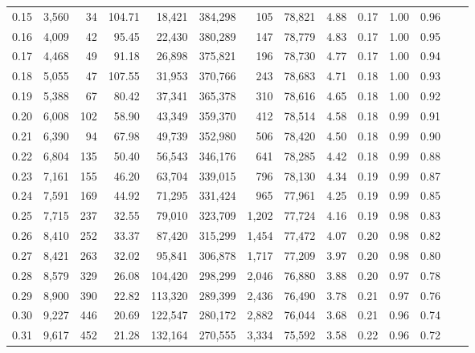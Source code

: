 \begin{tabular}{rrrrrrrrrrrrrr}
0.15 &   3,560 &     34 &  104.71 &   18,421 &  384,298 &     105 &  78,821 &  4.88 &  0.17 &  1.00 &      0.96 \\
0.16 &   4,009 &     42 &   95.45 &   22,430 &  380,289 &     147 &  78,779 &  4.83 &  0.17 &  1.00 &      0.95 \\
0.17 &   4,468 &     49 &   91.18 &   26,898 &  375,821 &     196 &  78,730 &  4.77 &  0.17 &  1.00 &      0.94 \\
0.18 &   5,055 &     47 &  107.55 &   31,953 &  370,766 &     243 &  78,683 &  4.71 &  0.18 &  1.00 &      0.93 \\
0.19 &   5,388 &     67 &   80.42 &   37,341 &  365,378 &     310 &  78,616 &  4.65 &  0.18 &  1.00 &      0.92 \\
0.20 &   6,008 &    102 &   58.90 &   43,349 &  359,370 &     412 &  78,514 &  4.58 &  0.18 &  0.99 &      0.91 \\
0.21 &   6,390 &     94 &   67.98 &   49,739 &  352,980 &     506 &  78,420 &  4.50 &  0.18 &  0.99 &      0.90 \\
0.22 &   6,804 &    135 &   50.40 &   56,543 &  346,176 &     641 &  78,285 &  4.42 &  0.18 &  0.99 &      0.88 \\
0.23 &   7,161 &    155 &   46.20 &   63,704 &  339,015 &     796 &  78,130 &  4.34 &  0.19 &  0.99 &      0.87 \\
0.24 &   7,591 &    169 &   44.92 &   71,295 &  331,424 &     965 &  77,961 &  4.25 &  0.19 &  0.99 &      0.85 \\
0.25 &   7,715 &    237 &   32.55 &   79,010 &  323,709 &   1,202 &  77,724 &  4.16 &  0.19 &  0.98 &      0.83 \\
0.26 &   8,410 &    252 &   33.37 &   87,420 &  315,299 &   1,454 &  77,472 &  4.07 &  0.20 &  0.98 &      0.82 \\
0.27 &   8,421 &    263 &   32.02 &   95,841 &  306,878 &   1,717 &  77,209 &  3.97 &  0.20 &  0.98 &      0.80 \\
0.28 &   8,579 &    329 &   26.08 &  104,420 &  298,299 &   2,046 &  76,880 &  3.88 &  0.20 &  0.97 &      0.78 \\
0.29 &   8,900 &    390 &   22.82 &  113,320 &  289,399 &   2,436 &  76,490 &  3.78 &  0.21 &  0.97 &      0.76 \\
0.30 &   9,227 &    446 &   20.69 &  122,547 &  280,172 &   2,882 &  76,044 &  3.68 &  0.21 &  0.96 &      0.74 \\
0.31 &   9,617 &    452 &   21.28 &  132,164 &  270,555 &   3,334 &  75,592 &  3.58 &  0.22 &  0.96 &      0.72 \\

\end{tabular}
